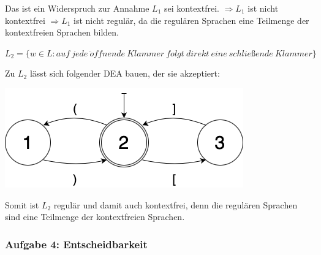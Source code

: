 \begin{teile}
	Das ist ein Widerspruch zur Annahme $L_1$ sei kontextfrei. $\Rightarrow L_1$ ist nicht kontextfrei $\Rightarrow L_1$ ist nicht regulär, da die regulären Sprachen eine Teilmenge der kontextfreien Sprachen bilden. 

	\vspace{0.3cm}
	\item 
	$L_2 = \{ w \in L: auf\ jede\ \ddot{o}ffnende\ Klammer\ folgt\ direkt\ eine\ schließende\ Klammer \}$
	
	Zu $L_2$ lässt sich folgender DEA bauen, der sie akzeptiert:
	\begin{center}
		\includegraphics[scale=0.5]{DEA zu Klammersprache.png}	
	\end{center}
	
	Somit ist $L_2$ regulär und damit auch kontextfrei, denn die regulären Sprachen sind eine Teilmenge der kontextfreien Sprachen.
	
\end{teile}

\newpage
\subsubsection{Aufgabe 4: Entscheidbarkeit}

